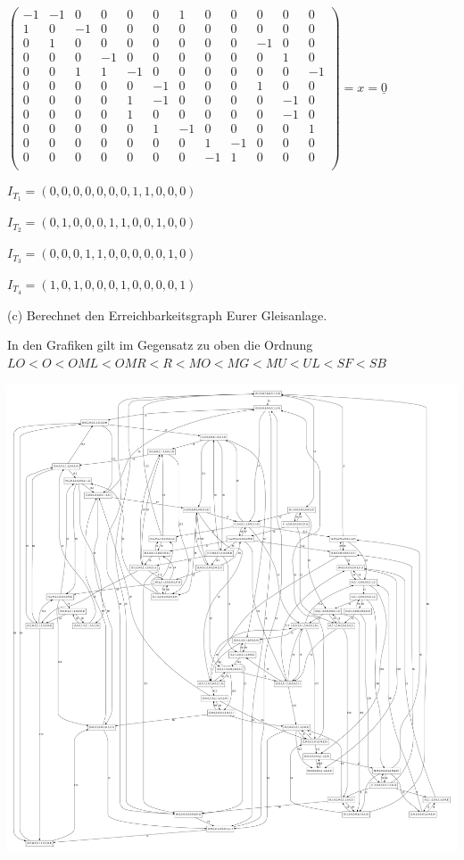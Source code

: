 \documentclass{scrreprt}
\begin{document}
\begin{enumerate}
\( \begin{pmatrix}
-1 &-1 & 0 & 0 & 0 & 0 & 1 & 0 & 0 & 0 & 0 & 0 \\
 1 & 0 &-1 & 0 & 0 & 0 & 0 & 0 & 0 & 0 & 0 & 0 \\
 0 & 1 & 0 & 0 & 0 & 0 & 0 & 0 & 0 &-1 & 0 & 0 \\
 0 & 0 & 0 &-1 & 0 & 0 & 0 & 0 & 0 & 0 & 1 & 0 \\
 0 & 0 & 1 & 1 &-1 & 0 & 0 & 0 & 0 & 0 & 0 &-1 \\
 0 & 0 & 0 & 0 & 0 &-1 & 0 & 0 & 0 & 1 & 0 & 0 \\
 0 & 0 & 0 & 0 & 1 &-1 & 0 & 0 & 0 & 0 &-1 & 0 \\
 0 & 0 & 0 & 0 & 1 & 0 & 0 & 0 & 0 & 0 &-1 & 0 \\
 0 & 0 & 0 & 0 & 0 & 1 &-1 & 0 & 0 & 0 & 0 & 1 \\
 0 & 0 & 0 & 0 & 0 & 0 & 0 & 1 &-1 & 0 & 0 & 0 \\
 0 & 0 & 0 & 0 & 0 & 0 & 0 &-1 & 1 & 0 & 0 & 0 \\
\end{pmatrix} = x = \underline{0} \)

$I_{T_1} = (0, 0, 0, 0, 0, 0, 0, 1, 1, 0, 0, 0)$

$I_{T_2} = (0, 1, 0, 0, 0, 1, 1, 0, 0, 1, 0, 0)$

$I_{T_3} = (0, 0, 0, 1, 1, 0, 0, 0, 0, 0, 1, 0)$

$I_{T_4} = (1, 0, 1, 0, 0, 0, 1, 0, 0, 0, 0, 1)$

(c) Berechnet den Erreichbarkeitsgraph Eurer Gleisanlage.

In den Grafiken gilt im Gegensatz zu oben die Ordnung \(LO < O < OML < OMR < R < MO < MG < MU < UL < SF < SB\)

\includegraphics[width=1\textwidth]{eg.pdf}


\end{enumerate}
\end{document}
